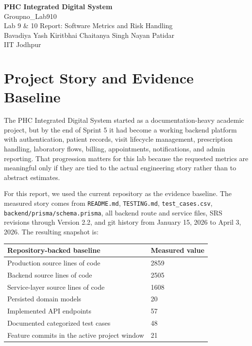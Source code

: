\documentclass[11pt,a4paper]{article}
\begin{document}
\begin{center}
{\LARGE\bfseries\color{TitleBlue} PHC Integrated Digital System}\\[0.3em]
{\Large Groupno\_Lab910}\\[0.6em]
{\large Lab 9 \& 10 Report: Software Metrics and Risk Handling}\\[0.8em]
{\normalsize Bavadiya Yash Kiritbhai \quad Chaitanya Singh \quad Nayan Patidar}\\[0.3em]
{\normalsize IIT Jodhpur}\\[0.8em]
\end{center}

\section{Project Story and Evidence Baseline}
The PHC Integrated Digital System started as a documentation-heavy academic project, but by the end of Sprint 5 it had become a working backend platform with authentication, patient records, visit lifecycle management, prescription handling, laboratory flows, billing, appointments, notifications, and admin reporting. That progression matters for this lab because the requested metrics are meaningful only if they are tied to the actual engineering story rather than to abstract estimates.

For this report, we used the current repository as the evidence baseline. The measured story comes from \texttt{README.md}, \texttt{TESTING.md}, \texttt{test\_cases.csv}, \texttt{backend/prisma/schema.prisma}, all backend route and service files, SRS revisions through Version 2.2, and git history from January 15, 2026 to April 3, 2026. The resulting snapshot is:

\begin{center}
\begin{tabular}{|p{8cm}|p{4cm}|}
\hline
\rowcolor{SoftBlue}
\textbf{Repository-backed baseline} & \textbf{Measured value} \\
\hline
Production source lines of code & 2859 \\
Backend source lines of code & 2505 \\
Service-layer source lines of code & 1608 \\
Persisted domain models & 20 \\
Implemented API endpoints & 57 \\
Documented categorized test cases & 48 \\
Feature commits in the active project window & 21 \\
\hline
\end{tabular}
\end{center}
\end{document}
